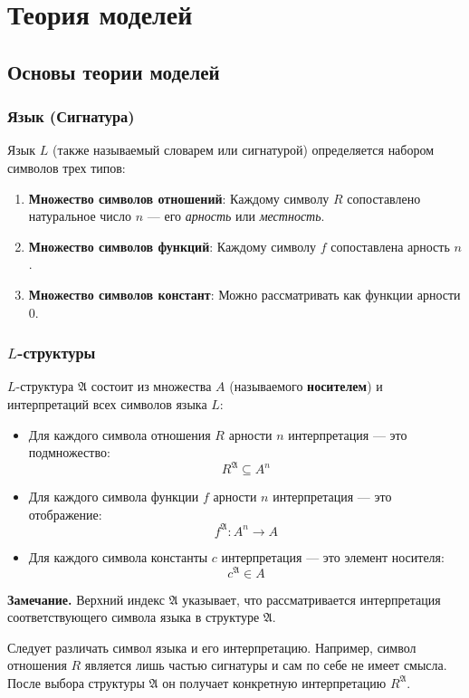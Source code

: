 \documentclass[12pt,a4paper,oneside,openany]{book}
\theoremstyle{definition}
\theoremstyle{plain}
\theoremstyle{remark}
\begin{document}
\chapter{Теория моделей}

\section{Основы теории моделей}

\subsection{Язык (Сигнатура)}

Язык $L$ (также называемый словарем или сигнатурой) определяется набором символов трех типов:
\begin{enumerate}
    \item \textbf{Множество символов отношений}: Каждому символу $R$ сопоставлено натуральное число $n$ — его \textit{арность} или \textit{местность}.
    \item \textbf{Множество символов функций}: Каждому символу $f$ сопоставлена арность $n$.
    \item \textbf{Множество символов констант}: Можно рассматривать как функции арности 0.
\end{enumerate}

\subsection{\texorpdfstring{$L$}{L}-структуры}

$L$-структура $\mathfrak{A}$ состоит из множества $A$ (называемого \textbf{носителем}) и интерпретаций всех символов языка $L$:
\begin{itemize}
    \item Для каждого символа отношения $R$ арности $n$ интерпретация — это подмножество:
    \[ R^{\mathfrak{A}} \subseteq A^n \]
    \item Для каждого символа функции $f$ арности $n$ интерпретация — это отображение:
    \[ f^{\mathfrak{A}}: A^n \to A \]
    \item Для каждого символа константы $c$ интерпретация — это элемент носителя:
    \[ c^{\mathfrak{A}} \in A \]
\end{itemize}
\textbf{Замечание.}
Верхний индекс $\mathfrak A$ указывает, что рассматривается интерпретация соответствующего символа языка в структуре $\mathfrak A$.

Следует различать символ языка и его интерпретацию.
Например, символ отношения $R$ является лишь частью сигнатуры и сам по себе не имеет смысла.
После выбора структуры $\mathfrak A$ он получает конкретную интерпретацию $R^{\mathfrak A}$.
\end{document}
